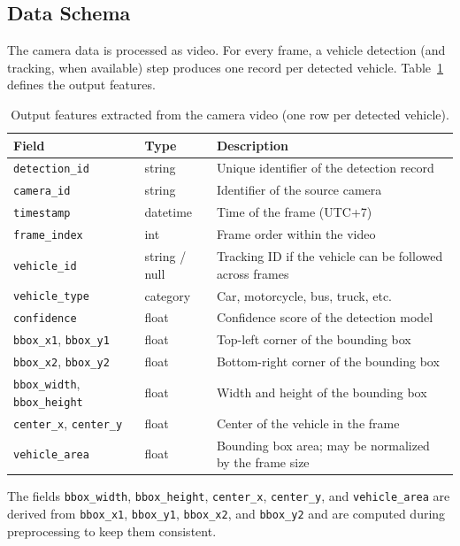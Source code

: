 \documentclass[12pt,a4paper]{article}
\begin{document}
\subsection{Data Schema}
\label{subsec:schema}
The camera data is processed as video. For every frame, a vehicle detection
(and tracking, when available) step produces one record per detected vehicle.
Table~\ref{tab:schema} defines the output features.

\begin{table}[H]
\centering
\caption{Output features extracted from the camera video (one row per detected vehicle).}
\label{tab:schema}
\begin{tabularx}{\textwidth}{@{}l l X@{}}
\toprule
\textbf{Field} & \textbf{Type} & \textbf{Description} \\
\midrule
\texttt{detection\_id}  & string   & Unique identifier of the detection record \\
\texttt{camera\_id}     & string   & Identifier of the source camera \\
\texttt{timestamp}      & datetime & Time of the frame (UTC+7) \\
\texttt{frame\_index}   & int      & Frame order within the video \\
\texttt{vehicle\_id}    & string / null & Tracking ID if the vehicle can be followed across frames \\
\texttt{vehicle\_type}  & category & Car, motorcycle, bus, truck, etc. \\
\texttt{confidence}     & float    & Confidence score of the detection model \\
\texttt{bbox\_x1}, \texttt{bbox\_y1} & float & Top-left corner of the bounding box \\
\texttt{bbox\_x2}, \texttt{bbox\_y2} & float & Bottom-right corner of the bounding box \\
\texttt{bbox\_width}, \texttt{bbox\_height} & float & Width and height of the bounding box \\
\texttt{center\_x}, \texttt{center\_y} & float & Center of the vehicle in the frame \\
\texttt{vehicle\_area} & float & Bounding box area; may be normalized by the frame size \\
\bottomrule
\end{tabularx}
\end{table}

The fields \texttt{bbox\_width}, \texttt{bbox\_height}, \texttt{center\_x},
\texttt{center\_y}, and \texttt{vehicle\_area} are derived from
\texttt{bbox\_x1}, \texttt{bbox\_y1}, \texttt{bbox\_x2}, and \texttt{bbox\_y2}
and are computed during preprocessing to keep them consistent.
\end{document}
